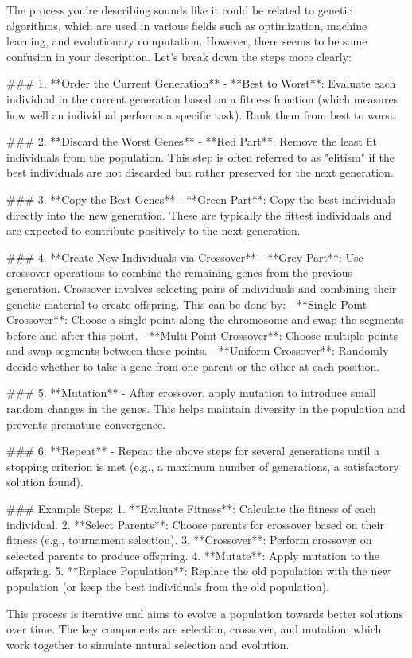 The process you're describing sounds like it could be related to genetic algorithms, which are used in various fields such as optimization, machine learning, and evolutionary computation. However, there seems to be some confusion in your description. Let's break down the steps more clearly:

### 1. **Order the Current Generation**
   - **Best to Worst**: Evaluate each individual in the current generation based on a fitness function (which measures how well an individual performs a specific task). Rank them from best to worst.

### 2. **Discard the Worst Genes**
   - **Red Part**: Remove the least fit individuals from the population. This step is often referred to as "elitism" if the best individuals are not discarded but rather preserved for the next generation.

### 3. **Copy the Best Genes**
   - **Green Part**: Copy the best individuals directly into the new generation. These are typically the fittest individuals and are expected to contribute positively to the next generation.

### 4. **Create New Individuals via Crossover**
   - **Grey Part**: Use crossover operations to combine the remaining genes from the previous generation. Crossover involves selecting pairs of individuals and combining their genetic material to create offspring. This can be done by:
     - **Single Point Crossover**: Choose a single point along the chromosome and swap the segments before and after this point.
     - **Multi-Point Crossover**: Choose multiple points and swap segments between these points.
     - **Uniform Crossover**: Randomly decide whether to take a gene from one parent or the other at each position.

### 5. **Mutation**
   - After crossover, apply mutation to introduce small random changes in the genes. This helps maintain diversity in the population and prevents premature convergence.

### 6. **Repeat**
   - Repeat the above steps for several generations until a stopping criterion is met (e.g., a maximum number of generations, a satisfactory solution found).

### Example Steps:
1. **Evaluate Fitness**: Calculate the fitness of each individual.
2. **Select Parents**: Choose parents for crossover based on their fitness (e.g., tournament selection).
3. **Crossover**: Perform crossover on selected parents to produce offspring.
4. **Mutate**: Apply mutation to the offspring.
5. **Replace Population**: Replace the old population with the new population (or keep the best individuals from the old population).

This process is iterative and aims to evolve a population towards better solutions over time. The key components are selection, crossover, and mutation, which work together to simulate natural selection and evolution.